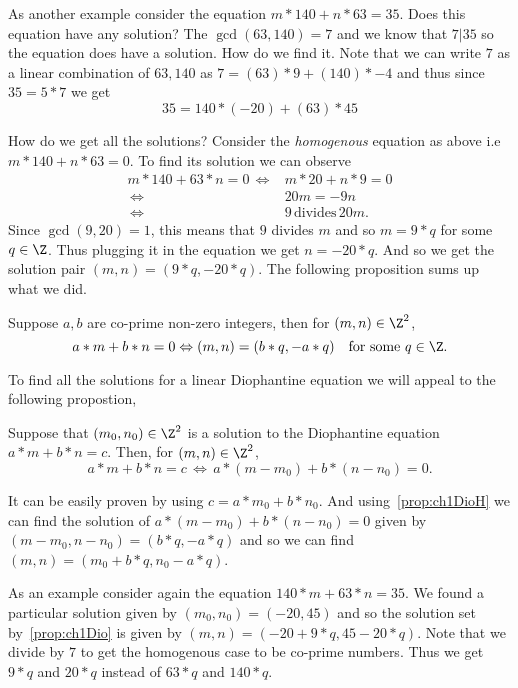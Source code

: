 As another example consider the equation $m*140 + n*63 = 35$. Does this equation have any solution?
The $\gcd(63,140) = 7$ and we know that $7 | 35$ so the equation does have a solution. How do we
find it. Note that we can write $7$ as a linear combination of $63,140$ as $ 7 = (63)*9 +
(140)*-4$ and thus since $35 = 5*7$ we get
\begin{equation*}
    35 = 140*(-20) + (63)*45
\end{equation*}

How do we get all the solutions? Consider the \emph{homogenous} equation as above i.e 
$m*140 + n*63 = 0$. To find its solution we can observe
\begin{align*}
    m*140 + 63*n = 0 \, \Leftrightarrow & m*20 + n*9 = 0 \\
    \, \Leftrightarrow & 20m = -9n \\
    \, \Leftrightarrow & 9 \, \text{divides} \, 20m.
\end{align*}
Since $\gcd(9,20) = 1$, this means that $9$ divides $m$ and so $m = 9*q$ for some $q \in \Z$. Thus
plugging it in the equation we get $n = -20*q$. And so we get the solution pair $(m,n) =
(9*q,-20*q)$. The following proposition sums up what we did.

\begin{Proposition}
    Suppose $a,b$ are co-prime non-zero integers, then for $(m,n) \in \Z^2$,
    \begin{equation*}
	a*m + b*n = 0 \Leftrightarrow (m,n) = (b*q,-a*q) \quad \text{for some $q \in \Z$}.
    \end{equation*}
\label{prop:ch1DioH}
\end{Proposition}

To find all the solutions for a linear Diophantine equation we will appeal to the following
propostion,
\begin{Proposition}
    Suppose that $(m_0,n_0) \in \Z^2$ is a solution to the Diophantine equation $a*m + b*n = c$.
    Then, for $(m,n) \in \Z^2$, 
    \begin{equation*}
	a*m + b*n = c \, \Leftrightarrow \, a*(m - m_0) + b*(n - n_0) = 0.
    \end{equation*}
\label{prop:ch1Dio}
\end{Proposition}
It can be easily proven by using $c = a*m_0 + b*n_0$. And using~\ref{prop:ch1DioH} we can find the
solution of $a*(m - m_0) + b*(n - n_0) = 0$ given by $(m-m_0,n-n_0) = (b*q,-a*q)$ and so we can find
$(m,n) = (m_0 + b*q, n_0 - a*q)$.

As an example consider again the equation $140*m + 63*n = 35$. We found a particular solution given
by $(m_0,n_0) = (-20,45)$ and so the solution set by~\ref{prop:ch1Dio} is given by
$(m,n) = (-20 + 9*q, 45 - 20*q)$. Note that we divide by $7$ to get the homogenous case to be
co-prime numbers. Thus we get $9*q$ and $20*q$ instead of $63*q$ and $140*q$.



